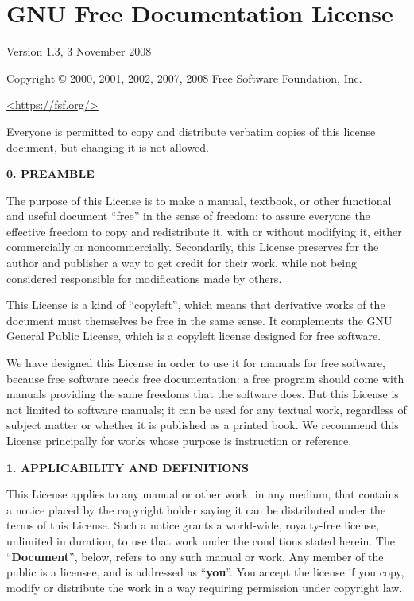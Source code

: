 \documentclass{scrbook}
\begin{document}
\chapter{GNU Free Documentation License}
\label{chp:gnufdl}

 \begin{center}

       Version 1.3, 3 November 2008


 Copyright \copyright{} 2000, 2001, 2002, 2007, 2008  Free Software Foundation, Inc.
 
 \bigskip
 
     \url{<https://fsf.org/>}
  
 \bigskip
 
 Everyone is permitted to copy and distribute verbatim copies
 of this license document, but changing it is not allowed.
\end{center}


\begin{center}
{\Large\bfseries 0. PREAMBLE\par}
\end{center}
The purpose of this License is to make a manual, textbook, or other
functional and useful document ``free'' in the sense of freedom: to
assure everyone the effective freedom to copy and redistribute it,
with or without modifying it, either commercially or noncommercially.
Secondarily, this License preserves for the author and publisher a way
to get credit for their work, while not being considered responsible
for modifications made by others.

This License is a kind of ``copyleft'', which means that derivative
works of the document must themselves be free in the same sense.  It
complements the GNU General Public License, which is a copyleft
license designed for free software.

We have designed this License in order to use it for manuals for free
software, because free software needs free documentation: a free
program should come with manuals providing the same freedoms that the
software does.  But this License is not limited to software manuals;
it can be used for any textual work, regardless of subject matter or
whether it is published as a printed book.  We recommend this License
principally for works whose purpose is instruction or reference.


\begin{center}
{\Large\bfseries 1. APPLICABILITY AND DEFINITIONS\par}
\end{center}
This License applies to any manual or other work, in any medium, that
contains a notice placed by the copyright holder saying it can be
distributed under the terms of this License.  Such a notice grants a
world-wide, royalty-free license, unlimited in duration, to use that
work under the conditions stated herein.  The ``\textbf{Document}'', below,
refers to any such manual or work.  Any member of the public is a
licensee, and is addressed as ``\textbf{you}''.  You accept the license if you
copy, modify or distribute the work in a way requiring permission
under copyright law.
\end{document}
